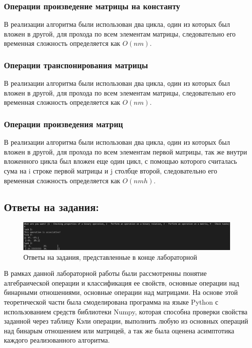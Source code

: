 \documentclass[spec, och, labwork]{shiza}
\begin{document}
    \subsubsection{Операции произведение матрицы на константу}
            В реализации алгоритма были использован два цикла, один из которых был вложен в другой, для прохода по всем элементам матрицы, следовательно его временная сложность определяется как $O(nm)$.

    \subsubsection{Операции транспонирования матрицы}
            В реализации алгоритма были использован два цикла, один из которых был вложен в другой, для прохода по всем элементам матрицы, следовательно его временная сложность определяется как $O(nm)$.

    \subsubsection{Операции произведения матриц}
            В реализации алгоритма были использован два цикла, один из которых был вложен в другой, для прохода по всем элементам первой матрицы, так же внутри вложенного цикла был вложен еще один цикл, 
            с помощью которого считалась сума на i строке первой матрицы и j столбце второй, следовательно его временная сложность определяется как $O(nmh)$.

\subsection{Ответы на задания:}

\begin{figure}[H]
    \centering      %
    \includegraphics[width=1.\textwidth]{12}
    \caption{Ответы на задания, представленные в конце лабораторной}
    \label{fig:image1}
\end{figure}
    
\conclusion

В рамках данной лабораторной работы были рассмотренны понятие алгебраической операции и классификация ее свойств, основные операции над бинарными отношениями,
основные операции над матрицами. На основе этой теоретической части была смоделирована программа на языке Python с 
использованием средств библиотеки Numpy, которая способна проверки свойства заданной через таблицу Кэли операции, выполнить любую из основных операций над бинарым отношением
или матрицей, а так же была оценена асимптотика каждого реализованного алгоритма.
\end{document}

